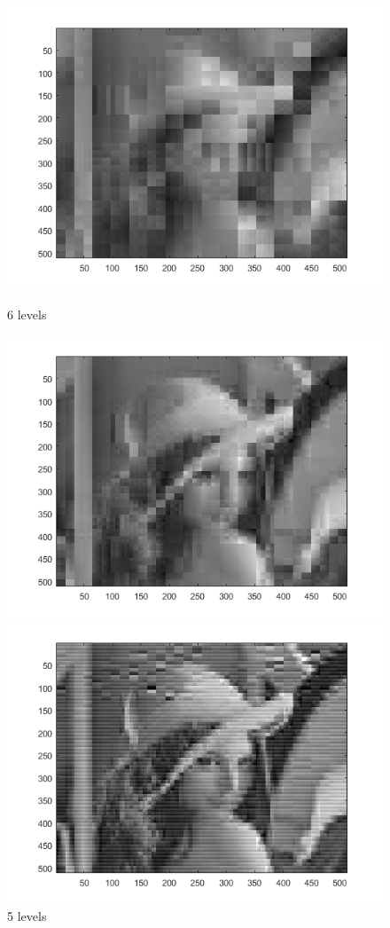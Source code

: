 \documentclass[english]{article}
\begin{document}
\begin{figure}[!htb]
  \includegraphics[width=\linewidth]{lenna/lenna_approx.png}
  \caption{6 levels}\label{fig:awesome_image1}
\endminipage\hfill
{}
  \includegraphics[width=\linewidth]{lenna/lenna_approx_2.png}
  \caption{5 levels}\label{fig:awesome_image2}
\endminipage\hfill
{}%
  \includegraphics[width=\linewidth]{lenna/lenna_approx_3.png}

\end{figure}
\end{document}
